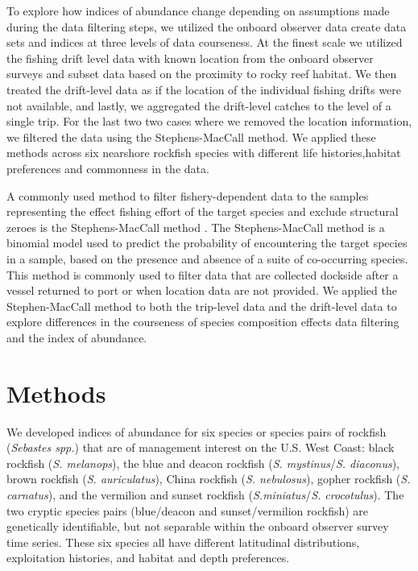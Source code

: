 \documentclass[
  12pt,
  authoryear,
  preprint,
  3p]{elsarticle}
\begin{document}
To explore how indices of abundance change depending on assumptions made
during the data filtering steps, we utilized the onboard observer data
create data sets and indices at three levels of data courseness. At the
finest scale we utilized the fishing drift level data with known
location from the onboard observer surveys and subset data based on the
proximity to rocky reef habitat. We then treated the drift-level data as
if the location of the individual fishing drifts were not available, and
lastly, we aggregated the drift-level catches to the level of a single
trip. For the last two two cases where we removed the location
information, we filtered the data using the Stephens-MacCall method. We
applied these methods across six nearshore rockfish species with
different life histories,habitat preferences and commonness in the data.

A commonly used method to filter fishery-dependent data to the samples
representing the effect fishing effort of the target species and exclude
structural zeroes is the Stephens-MacCall method
\citeyearpar{Stephens:2004:MAS}. The Stephens-MacCall method is a
binomial model used to predict the probability of encountering the
target species in a sample, based on the presence and absence of a suite
of co-occurring species. This method is commonly used to filter data
that are collected dockside after a vessel returned to port or when
location data are not provided. We applied the Stephen-MacCall method to
both the trip-level data and the drift-level data to explore differences
in the courseness of species composition effects data filtering and the
index of abundance.

\hypertarget{methods}{%
\section{Methods}\label{methods}}

We developed indices of abundance for six species or species pairs of
rockfish (\emph{Sebastes spp.}) that are of management interest on the
U.S. West Coast: black rockfish (\emph{S. melanops}), the blue and
deacon rockfish (\emph{S. mystinus}/\emph{S. diaconus}), brown rockfish
(\emph{S. auriculatus}), China rockfish (\emph{S. nebulosus}), gopher
rockfish (\emph{S. carnatus}), and the vermilion and sunset rockfish
(\emph{S.miniatus}/\emph{S. crocotulus}). The two cryptic species pairs
(blue/deacon and sunset/vermilion rockfish) are genetically
identifiable, but not separable within the onboard observer survey time
series. These six species all have different latitudinal distributions,
exploitation histories, and habitat and depth
preferences\citep{Love:2002:RNP}.
\end{document}
